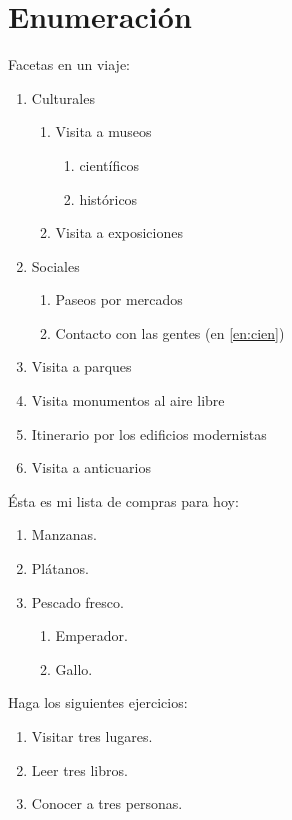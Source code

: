 \documentclass[12pt,
              ]{article}
\begin{document}
\section{Enumeración}

  Facetas en un viaje:
  \begin{enumerate}
  \item Culturales
    \begin{enumerate}
    \item Visita a museos
      \begin{enumerate}
      \item científicos \label{en:cien}
      \item históricos
      \end{enumerate}
    \item Visita a exposiciones
    \end{enumerate}
  \item Sociales
    \begin{enumerate}
    \item Paseos por mercados
    \item Contacto con las gentes (en \ref{en:cien})
    \end{enumerate}
  \item Visita a parques
  \item Visita monumentos al aire libre
  \item Itinerario por los edificios modernistas
  \item Visita a anticuarios
  \end{enumerate}

  Ésta es mi lista de compras para hoy:
  \begin{enumerate}[1(]
  \item Manzanas.
  \item Plátanos.
  \item Pescado fresco.
    \begin{enumerate}[a(]
    \item Emperador.
    \item Gallo.
    \end{enumerate}
  \end{enumerate}

  Haga los siguientes ejercicios:
  \begin{enumerate}[{Ejercicio} 1.]
  \item Visitar tres lugares. \label{en:visitar}
  \item Leer tres libros.
  \item Conocer a tres personas.
  \end{enumerate}  
\end{document}
